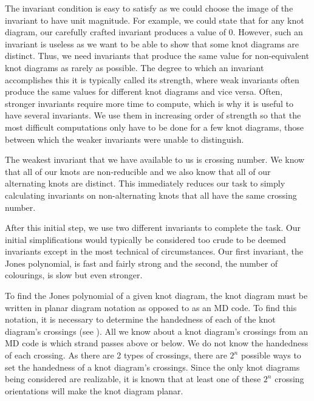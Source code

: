 \begin{paper}
The invariant condition is easy to satisfy as we could choose the image of the
invariant to have unit magnitude.
For example, we could state that for any knot diagram, our carefully crafted
invariant produces a value of 0.
However, such an invariant is useless as we want to be able to show that some
knot diagrams are distinct.
Thus, we need invariants that produce the same value for non-equivalent knot
diagrams as rarely as possible.
The degree to which an invariant accomplishes this it is typically called its
strength, where weak invariants often produce the same values for different knot
diagrams and vice versa.
Often, stronger invariants require more time to compute, which is why it is
useful to have several invariants.
We use them in increasing order of strength so that the most difficult
computations only have to be done for a few knot diagrams, those between which
the weaker invariants were unable to distinguish.

The weakest invariant that we have available to us is crossing number.
We know that all of our knots are non-reducible and we also know that all of our
alternating knots are distinct.
This immediately reduces our task to simply calculating invariants on
non-alternating knots that all have the same crossing number.

After this initial step, we use two different invariants to complete the task.
Our initial simplifications would typically be considered too crude to be deemed
invariants except in the most technical of circumstances.
Our first invariant, the Jones polynomial, is fast and fairly strong and the
second, the number of colourings, is slow but even stronger.



To find the Jones polynomial of a given knot diagram, the knot diagram must be
written in planar diagram notation as opposed to as an MD code.
To find this notation, it is necessary to determine the handedness of each of
the knot diagram's crossings (see \figCrossings).
All we know about a knot diagram's crossings from an MD code is which strand
passes above or below.
We do not know the handedness of each crossing.
As there are 2 types of crossings, there are $2^n$ possible ways to set the
handedness of a knot diagram's crossings.
Since the only knot diagrams being considered are realizable, it is known that
at least one of these $2^n$ crossing orientations will make the knot diagram
planar.


\end{paper}
